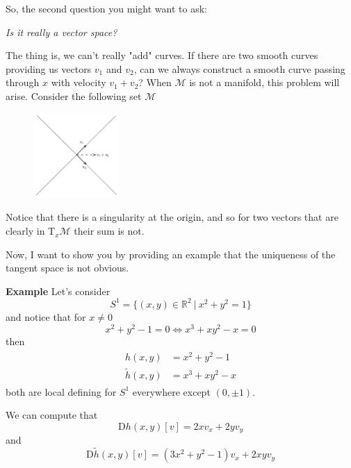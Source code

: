 \documentclass[12pt]{article}
\newcommand*{\T}{\mathrm{T}}
\newcommand*{\D}{\mathrm{D}}
\theoremstyle{definition}
\begin{document}
So, the second question you might want to ask: 

\textit{Is it really a vector space?} 

The thing is, we can't really "add" curves. If there are two smooth curves providing us vectors $v_1$ and $v_2$, can we always construct a smooth curve passing through $x$ with velocity $v_1 + v_2$? When $\mathcal{M}$ is not a manifold, this problem will arise. Consider the following set $\mathcal{M}$ 
\begin{figure}[h!]
    \includegraphics[width=0.29\textwidth]{figures/1.png}
    \centering 
\end{figure}

Notice that there is a singularity at the origin, and so for two vectors that are clearly in $\T_x \mathcal{M}$ their sum is not. 

Now, I want to show you by providing an example that the uniqueness of the tangent space is not obvious. 
$ $ 

\noindent \textbf{Example} Let's consider 
\begin{equation}
    S^{1}= \{(x, y) \in \mathbb{R}^2 \ | \ x^2 + y^2 = 1 \}
\end{equation}
and notice that for $x \neq 0$
\begin{equation*}
    x^2 + y^2 - 1 = 0 \Leftrightarrow x^3 + x y^2 - x = 0
\end{equation*}
then 
\begin{align}
\begin{split}
    h(x, y) &= x^2 + y^2 - 1 \\
    \tilde{h}(x, y) &= x^3 + x y^2 - x 
\end{split}
\end{align}
both are local defining for $S^{1}$ everywhere except $(0, \pm 1)$.

We can compute that 
\begin{equation}
    \D h(x, y)[v] = 2x v_x + 2y v_y
\end{equation}
and 
\begin{equation}
    \D\tilde{h}(x, y)[v ] = (3x^2 + y^2 - 1) v_x + 2xy v_y 
\end{equation}
\end{document}

